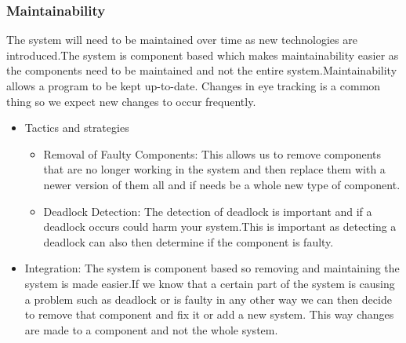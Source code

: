 \subsubsection{Maintainability}
\begin{flushleft}
The system will need to be maintained over time as new technologies are introduced.The system is component based which makes maintainability easier as the components need to be maintained and not the entire system.Maintainability allows a program to be kept up-to-date. Changes in eye tracking is a common thing so we expect new changes to occur frequently.
\begin{itemize}
\item{Tactics and strategies}
\begin{itemize}
\item{Removal of Faulty Components}: This allows us to remove components that are no longer working in the system and then replace them with a newer version of them all and if needs be a whole new type of component.
\item{Deadlock Detection}: The detection of deadlock is important and if a deadlock occurs could harm your system.This is important as detecting a deadlock can also then determine if the component is faulty.
\end{itemize}

\item{Integration}: The system is component based so removing and maintaining the system is made easier.If we know that a certain part of the system is causing a problem such as deadlock or is faulty in any other way we can then  decide to remove that component and fix it or add a new system. This way changes are made to a component and not the whole system.
\end{itemize}

\end{flushleft}
		
